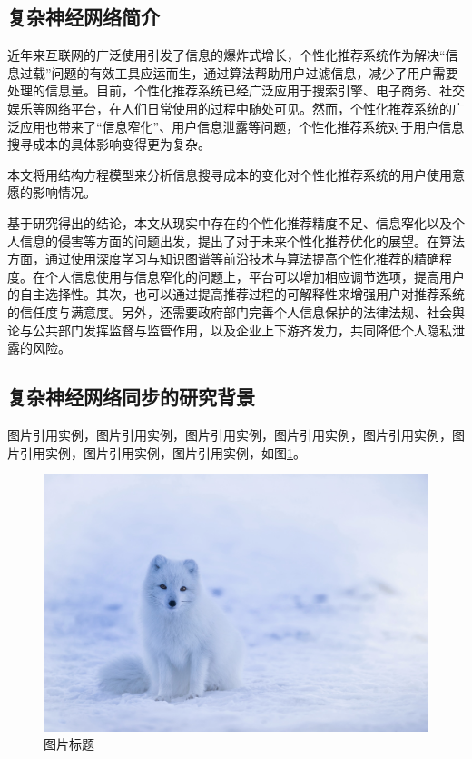 \documentclass[a4paper,zihao=-4,UTF8]{ctexart}
\numberwithin{equation}{section}
\begin{document}
	\subsection{复杂神经网络简介}
	近年来互联网的广泛使用引发了信息的爆炸式增长，个性化推荐系统作为解决“信息过载”问题的有效工具应运而生，通过算法帮助用户过滤信息，减少了用户需要处理的信息量。目前，个性化推荐系统已经广泛应用于搜索引擎、电子商务、社交娱乐等网络平台，在人们日常使用的过程中随处可见。然而，个性化推荐系统的广泛应用也带来了“信息窄化”、用户信息泄露等问题，个性化推荐系统对于用户信息搜寻成本的具体影响变得更为复杂。
	
	本文将用结构方程模型来分析信息搜寻成本的变化对个性化推荐系统的用户使用意愿的影响情况。
	
	基于研究得出的结论，本文从现实中存在的个性化推荐精度不足、信息窄化以及个人信息的侵害等方面的问题出发，提出了对于未来个性化推荐优化的展望。在算法方面，通过使用深度学习与知识图谱等前沿技术与算法提高个性化推荐的精确程度。在个人信息使用与信息窄化的问题上，平台可以增加相应调节选项，提高用户的自主选择性。其次，也可以通过提高推荐过程的可解释性来增强用户对推荐系统的信任度与满意度。另外，还需要政府部门完善个人信息保护的法律法规、社会舆论与公共部门发挥监督与监管作用，以及企业上下游齐发力，共同降低个人隐私泄露的风险。
	\subsection{复杂神经网络同步的研究背景}
	图片引用实例，图片引用实例，图片引用实例，图片引用实例，图片引用实例，图片引用实例，图片引用实例，图片引用实例，如图\ref{fig:1-1}。
	\begin{figure}[h]
		\centering
		\includegraphics[scale = .5]{./image/test.jpg}
		\caption{图片标题}
		\label{fig:1-1}
	\end{figure}
\end{document}
